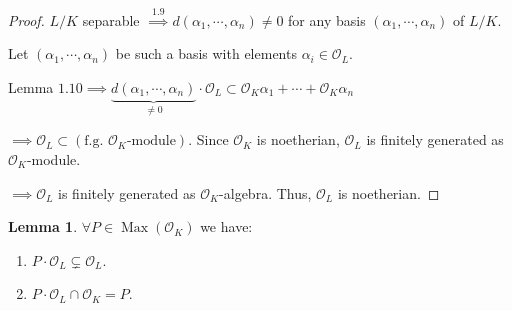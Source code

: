 \documentclass[openany]{amsbook}
\numberwithin{section}{chapter}
\theoremstyle{definition}
\newtheorem{lemma}[theorem]{Lemma}
\begin{document}
\begin{proof}
    \(L / K\) separable \(\overset{1.9}{\implies}  d(\alpha_1, \cdots , \alpha_n) \neq 0\) for any basis \((\alpha_1, \cdots , \alpha_n)\) of \(L / K\). 

    Let \((\alpha_1, \cdots , \alpha_n)\) be such a basis with elements \(\alpha_i \in \mathcal{O}_L\). 

    Lemma \(1.10 \implies \underbrace{d(\alpha_1, \cdots , \alpha_n) }_{\neq 0} \cdot \mathcal{O}_L \subset \mathcal{O}_K \alpha_1 + \cdots + \mathcal{O}_K \alpha_n\) 

    \(\implies \mathcal{O}_L \subset (\text{f.g. } \mathcal{O}_K \text{-module})\). Since \(\mathcal{O}_K\) is noetherian, \(\mathcal{O}_L\) is finitely generated as \(\mathcal{O}_K\)-module.

    \(\implies \mathcal{O}_L\) is finitely generated as \(\mathcal{O}_K\)-algebra. Thus, \(\mathcal{O}_L\) is noetherian.
\end{proof}

\begin{lemma}
    \(\forall P \in \operatorname{Max}(\mathcal{O}_K)\) we have:

    \begin{enumerate}[label=\roman*)]
        \item \(P \cdot \mathcal{O}_L \subsetneq \mathcal{O}_L\).
        \item \(P \cdot \mathcal{O}_L \cap \mathcal{O}_K = P\).   
    \end{enumerate}
\end{lemma}
\end{document}
